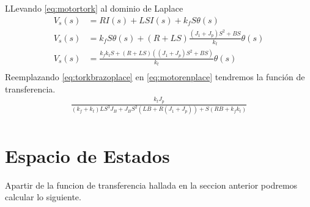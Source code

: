 \documentclass[a4paper]{IEEEtran} %
\begin{document}
LLevando \ref{eq:motortork} al dominio de Laplace 
\begin{equation}
    \begin{split}
        V_{s}(s)&=RI(s)+LSI(s)+k_{f}S\theta(s)\\
        V_{s}(s)&=k_{f}S\theta(s)+(R+LS)\frac{(J_{1}+J_{p})S^2+BS}{k_{t}}\theta(s)\\
        V_{s}(s)&=\frac{k_{f}k_{t}S+(R+LS)((J_{1}+J_{p})S^2+BS)}{k_{t}}\theta(s)\\
    \end{split}
    \label{eq:motorenplace}
\end{equation}
Reemplazando \ref{eq:torkbrazoplace} en \ref{eq:motorenplace} tendremos la función de transferencia.
\begin{equation}
    \begin{split}
        \frac{k_{t}J_{p}}{(k_{f}+k_{t})LS^3J_{B}+J_{B}S^2(LB+R(J_{1}+J_{p}))+S(RB+k_{f}k_{t})}\\
    \end{split}
    \label{eq:transfer}
\end{equation}

\section{Espacio de Estados}
Apartir de la funcion de transferencia hallada en la seccion anterior podremos calcular lo siguiente.
\end{document}
